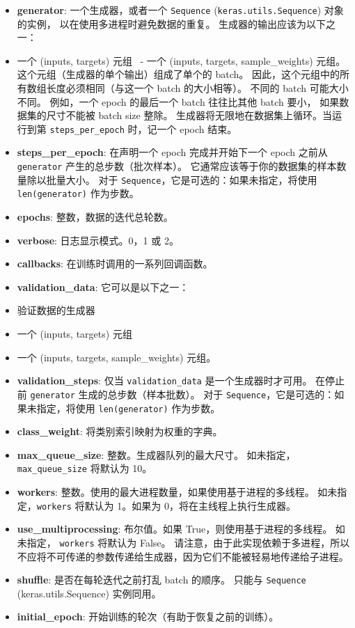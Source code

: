 \begin{itemize}
\tightlist
\item
  \textbf{generator}: 一个生成器，或者一个 \texttt{Sequence}
  (\texttt{keras.utils.Sequence}) 对象的实例，
  以在使用多进程时避免数据的重复。 生成器的输出应该为以下之一：
\item
  一个 (inputs, targets) 元组 ~- 一个 (inputs, targets, sample\_weights)
  元组。 这个元组（生成器的单个输出）组成了单个的 batch。
  因此，这个元组中的所有数组长度必须相同（与这一个 batch 的大小相等）。
  不同的 batch 可能大小不同。 例如，一个 epoch 的最后一个 batch
  往往比其他 batch 要小， 如果数据集的尺寸不能被 batch size 整除。
  生成器将无限地在数据集上循环。当运行到第 \texttt{steps\_per\_epoch}
  时，记一个 epoch 结束。
\item
  \textbf{steps\_per\_epoch}: 在声明一个 epoch 完成并开始下一个 epoch
  之前从 \texttt{generator} 产生的总步数（批次样本）。
  它通常应该等于你的数据集的样本数量除以批量大小。 对于
  \texttt{Sequence}，它是可选的：如果未指定，将使用\texttt{len(generator)}
  作为步数。
\item
  \textbf{epochs}: 整数，数据的迭代总轮数。
\item
  \textbf{verbose}: 日志显示模式。0，1 或 2。
\item
  \textbf{callbacks}: 在训练时调用的一系列回调函数。
\item
  \textbf{validation\_data}: 它可以是以下之一：
\item
  验证数据的生成器
\item
  一个 (inputs, targets) 元组
\item
  一个 (inputs, targets, sample\_weights) 元组。
\item
  \textbf{validation\_steps}: 仅当 \texttt{validation\_data}
  是一个生成器时才可用。 在停止前 \texttt{generator}
  生成的总步数（样本批数）。 对于
  \texttt{Sequence}，它是可选的：如果未指定，将使用
  \texttt{len(generator)} 作为步数。
\item
  \textbf{class\_weight}: 将类别索引映射为权重的字典。
\item
  \textbf{max\_queue\_size}: 整数。生成器队列的最大尺寸。
  如未指定，\texttt{max\_queue\_size} 将默认为 10。
\item
  \textbf{workers}: 整数。使用的最大进程数量，如果使用基于进程的多线程。
  如未指定，\texttt{workers} 将默认为 1。如果为
  0，将在主线程上执行生成器。
\item
  \textbf{use\_multiprocessing}: 布尔值。如果
  True，则使用基于进程的多线程。 如未指定， \texttt{workers} 将默认为
  False。
  请注意，由于此实现依赖于多进程，所以不应将不可传递的参数传递给生成器，因为它们不能被轻易地传递给子进程。
\item
  \textbf{shuffle}: 是否在每轮迭代之前打乱 batch 的顺序。 只能与
  \texttt{Sequence} (keras.utils.Sequence) 实例同用。
\item
  \textbf{initial\_epoch}: 开始训练的轮次（有助于恢复之前的训练）。
\end{itemize}

